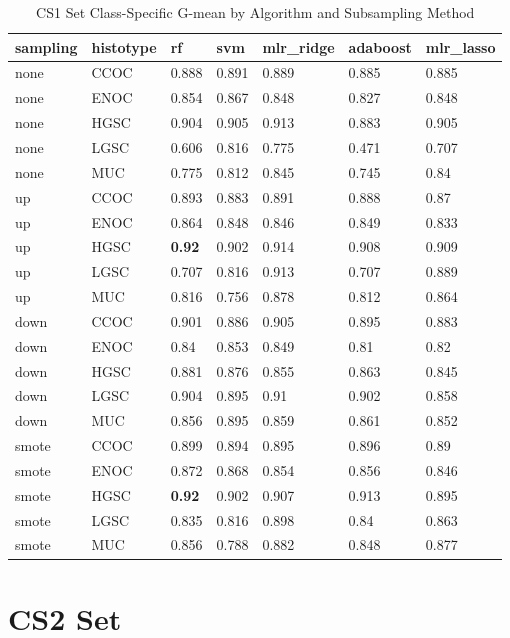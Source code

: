 \documentclass[
]{report}
\begin{document}
\begin{table}

\caption{\label{tab:cs1-gmean-class-table}CS1 Set Class-Specific G-mean by Algorithm and Subsampling Method}
\centering
\begin{tabular}[t]{l|l|l|l|l|l|l}
\hline
sampling & histotype & rf & svm & mlr\_ridge & adaboost & mlr\_lasso\\
\hline
none & CCOC & 0.888 & 0.891 & 0.889 & 0.885 & 0.885\\
\hline
none & ENOC & 0.854 & 0.867 & 0.848 & 0.827 & 0.848\\
\hline
none & HGSC & 0.904 & 0.905 & 0.913 & 0.883 & 0.905\\
\hline
none & LGSC & 0.606 & 0.816 & 0.775 & 0.471 & 0.707\\
\hline
none & MUC & 0.775 & 0.812 & 0.845 & 0.745 & 0.84\\
\hline
up & CCOC & 0.893 & 0.883 & 0.891 & 0.888 & 0.87\\
\hline
up & ENOC & 0.864 & 0.848 & 0.846 & 0.849 & 0.833\\
\hline
up & HGSC & \textbf{0.92} & 0.902 & 0.914 & 0.908 & 0.909\\
\hline
up & LGSC & 0.707 & 0.816 & 0.913 & 0.707 & 0.889\\
\hline
up & MUC & 0.816 & 0.756 & 0.878 & 0.812 & 0.864\\
\hline
down & CCOC & 0.901 & 0.886 & 0.905 & 0.895 & 0.883\\
\hline
down & ENOC & 0.84 & 0.853 & 0.849 & 0.81 & 0.82\\
\hline
down & HGSC & 0.881 & 0.876 & 0.855 & 0.863 & 0.845\\
\hline
down & LGSC & 0.904 & 0.895 & 0.91 & 0.902 & 0.858\\
\hline
down & MUC & 0.856 & 0.895 & 0.859 & 0.861 & 0.852\\
\hline
smote & CCOC & 0.899 & 0.894 & 0.895 & 0.896 & 0.89\\
\hline
smote & ENOC & 0.872 & 0.868 & 0.854 & 0.856 & 0.846\\
\hline
smote & HGSC & \textbf{0.92} & 0.902 & 0.907 & 0.913 & 0.895\\
\hline
smote & LGSC & 0.835 & 0.816 & 0.898 & 0.84 & 0.863\\
\hline
smote & MUC & 0.856 & 0.788 & 0.882 & 0.848 & 0.877\\
\hline
\end{tabular}
\end{table}

\hypertarget{cs2-set}{%
\section{CS2 Set}\label{cs2-set}}
\end{document}

